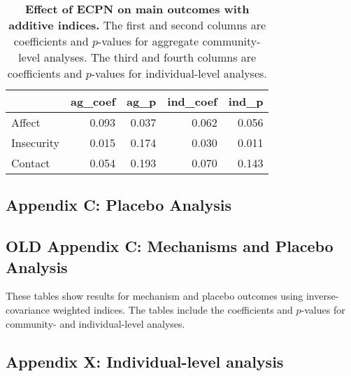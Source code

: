 \documentclass[
]{article}
\newenvironment{Shaded}{\begin{snugshade}}{\end{snugshade}}
\newcommand{\FunctionTok}[1]{\textcolor[rgb]{0.00,0.00,0.00}{#1}}
\newcommand{\NormalTok}[1]{#1}
\newcommand{\SpecialCharTok}[1]{\textcolor[rgb]{0.00,0.00,0.00}{#1}}
\newcommand{\StringTok}[1]{\textcolor[rgb]{0.31,0.60,0.02}{#1}}
\begin{document}
\begin{table}[H]
\begin{center}

\begin{tabular}{l|r|r|r|r}
\hline
  & ag\_coef & ag\_p & ind\_coef & ind\_p\\
\hline
Affect & 0.093 & 0.037 & 0.062 & 0.056\\
\hline
Insecurity & 0.015 & 0.174 & 0.030 & 0.011\\
\hline
Contact & 0.054 & 0.193 & 0.070 & 0.143\\
\hline
\end{tabular}


\caption{\label{tab:add_ind_tab}\textbf{Effect of ECPN on main outcomes with additive indices.} The first and second columns are coefficients and $p$-values for aggregate community-level analyses.  The third and fourth columns are coefficients and $p$-values for individual-level analyses.}
\end{center}
\end{table}

\hypertarget{appendix-c-placebo-analysis}{%
\subsection{Appendix C: Placebo
Analysis}\label{appendix-c-placebo-analysis}}

\hypertarget{old-appendix-c-mechanisms-and-placebo-analysis}{%
\subsection{OLD Appendix C: Mechanisms and Placebo
Analysis}\label{old-appendix-c-mechanisms-and-placebo-analysis}}

These tables show results for mechanism and placebo outcomes using
inverse-covariance weighted indices. The tables include the coefficients
and \(p\)-values for community- and individual-level analyses.

\hypertarget{appendix-x-individual-level-analysis}{%
\subsection{Appendix X: Individual-level
analysis}\label{appendix-x-individual-level-analysis}}

\begin{Shaded}
\end{Shaded}
\end{document}
